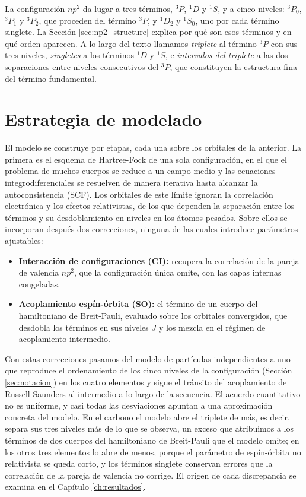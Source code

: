 La configuración $np^2$ da lugar a tres términos, $^3P$, $^1D$ y $^1S$, y a cinco niveles: $^3P_0$, $^3P_1$ y $^3P_2$, que proceden del término $^3P$, y $^1D_2$ y $^1S_0$, uno por cada término singlete. La Sección \ref{sec:np2_structure} explica por qué son esos términos y en qué orden aparecen. A lo largo del texto llamamos \textit{triplete} al término $^3P$ con sus tres niveles, \textit{singletes} a los términos $^1D$ y $^1S$, e \textit{intervalos del triplete} a las dos separaciones entre niveles consecutivos del $^3P$, que constituyen la estructura fina del término fundamental.

\section{Estrategia de modelado}

El modelo se construye por etapas, cada una sobre los orbitales de la anterior. La primera es el esquema de Hartree-Fock de una sola configuración, en el que el problema de muchos cuerpos se reduce a un campo medio y las ecuaciones integrodiferenciales se resuelven de manera iterativa hasta alcanzar la autoconsistencia (SCF). Los orbitales de este límite ignoran la correlación electrónica y los efectos relativistas, de los que dependen la separación entre los términos y su desdoblamiento en niveles en los átomos pesados. Sobre ellos se incorporan después dos correcciones, ninguna de las cuales introduce parámetros ajustables:
\begin{itemize}
    \item \textbf{Interacción de configuraciones (CI):} recupera la correlación de la pareja de valencia $np^2$, que la configuración única omite, con las capas internas congeladas.
    \item \textbf{Acoplamiento espín-órbita (SO):} el término de un cuerpo del hamiltoniano de Breit-Pauli, evaluado sobre los orbitales convergidos, que desdobla los términos en sus niveles $J$ y los mezcla en el régimen de acoplamiento intermedio.
\end{itemize}

Con estas correcciones pasamos del modelo de partículas independientes a uno que reproduce el ordenamiento de los cinco niveles de la configuración (Sección \ref{sec:notacion}) en los cuatro elementos y sigue el tránsito del acoplamiento de Russell-Saunders al intermedio a lo largo de la secuencia. El acuerdo cuantitativo no es uniforme, y casi todas las desviaciones apuntan a una aproximación concreta del modelo. En el carbono el modelo abre el triplete de más, es decir, separa sus tres niveles más de lo que se observa, un exceso que atribuimos a los términos de dos cuerpos del hamiltoniano de Breit-Pauli que el modelo omite; en los otros tres elementos lo abre de menos, porque el parámetro de espín-órbita no relativista se queda corto, y los términos singlete conservan errores que la correlación de la pareja de valencia no corrige. El origen de cada discrepancia se examina en el Capítulo \ref{ch:resultados}.


